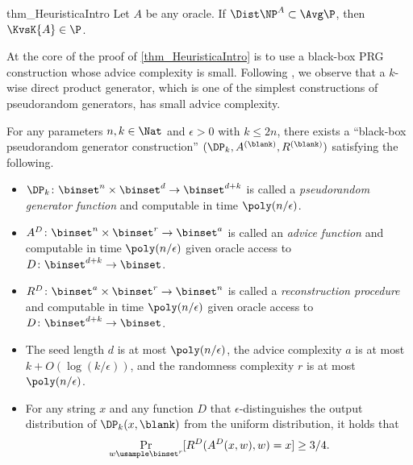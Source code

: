 \documentclass{toc}
\begin{document}
\begin{remindertheorem}
  {thm_HeuristicaIntro}
  Let $A$ be any oracle.
  If $\Dist\NP^A \subset \Avg\P$,
  then $\KvsK{A} \in \P$.
\end{remindertheorem}



%
%
%
%
%
%
%
%
%
%
%
%
%
%

At the core of the proof of \cref{thm_HeuristicaIntro} is to use a black-box PRG construction whose advice complexity is small.
%
%
Following \cite{Hirahara20_stoc_conf},
we observe that a $k$-wise direct product generator, which is one of the simplest constructions of pseudorandom generators,
has small advice complexity.

\begin{theorem}
  \label{thm_DPConstruction}
  For any parameters $n, k \in \Nat$ and $\epsilon > 0$ with $k \le 2n$,
  there exists a ``black-box pseudorandom generator construction'' $(\DP_k, A^{(\blank)}, R^{(\blank)})$
  satisfying the following.
  \begin{itemize}
    \item
          $\DP_k \colon \binset^n \times \binset^d \to \binset^{d + k}$
          is called a \emph{pseudorandom generator function}
          and computable in time $\poly(n / \epsilon)$.
    \item
          $A^D \colon \binset^n \times \binset^r \to \binset^a$
          is called an \emph{advice function}
          and computable in time $\poly(n / \epsilon)$ given oracle access to
          $D \colon \binset^{d+k} \to \binset$.
    \item
          $R^D \colon \binset^a \times \binset^r \to \binset^n$
          is called a \emph{reconstruction procedure}
          and computable in time $\poly(n / \epsilon)$ given oracle access to
          $D \colon \binset^{d+k} \to \binset$.
    \item
          The seed length $d$ is at most $\poly(n / \epsilon)$,
          the advice complexity $a$ is at most $k + O(\log (k / \epsilon))$,
          and
          the randomness complexity $r$ is at most $\poly(n / \epsilon)$.
    \item
          For any string $x$ and any function $D$ that $\epsilon$-distinguishes
          the output distribution of $\DP_k(x, \blank)$
          from the uniform distribution,
          it holds that
          $$
            \Pr_{w \usample \binset^r}[ R^D(A^D(x, w), w) = x ] \ge 3 / 4.
          $$
  \end{itemize}
\end{theorem}
\end{document}
